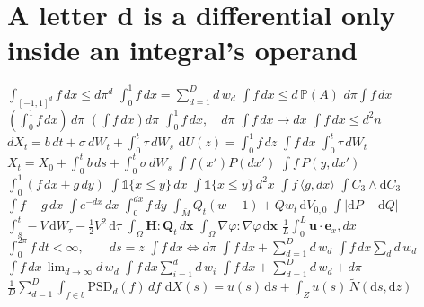 \documentclass{article}
\begin{document}
\section{A letter d is a differential only inside an integral's operand}
$\int_{[-1,1]^d}f\,dx\leq d\pi^{d}$ $\int_0^1 f\,dx=\sum_{d=1}^D d\,w_d$ $\int f\,dx\le d\,\mathbb{P}(A)$ $d\pi\int f\,dx$
$(\int_0^1 f\,dx)\,d\pi$ $\left(\int f\,dx\right) d\pi$ $\int_0^1 f\,dx,\quad d\pi$ $\int f\,dx\to d x$ $\int f\,dx\le d^2 n$
$dX_t=b\,dt+\sigma\,dW_t+\int_0^t\tau\,dW_s$ $\mathrm{d}U(z)=\int_0^1 f\,dz$
$\int f\,dx$ $\int_0^t\tau\,dW_t$ $X_t=X_0+\int_0^t b\,ds+\int_0^t\sigma\,dW_s$ $\int f(x')P(dx')$ $\int f\,P(y,dx')$
$\int_0^1(f\,dx+g\,dy)$ $\int\mathbb{1}\{x\le y\}\,dx$ $\int\mathbb{1}\{x\le y\}\,d^2x$ $\int f\,\langle g, dx\rangle$ $\int C_3\wedge\mathrm{d}C_3$
$\int f-g\,dx$ $\int e^{-d x}\,dx$ $\int_0^{d x} f\,dy$
$\int_{\bar M}Q_t(w-1)+Qw_t\,\mathrm{d}V_{0,0}$ $\int|\mathrm{d}P-\mathrm{d}Q|$ $\int_s^t-V\,\mathrm{d}W_\tau-\frac12V^2\,\mathrm{d}\tau$
$\int_\Omega\mathbf{H}:\mathbf{Q}_t\,d\mathbf{x}$ $\int_\Omega\nabla\varphi\colon\nabla\varphi\,\mathrm{d}\mathbf{x}$ $\frac1L\int_0^L\mathbf u\cdot\mathbf e_x,dx$
$\int_0^{2\pi}f\,dt<\infty,\qquad ds=z$ $\int f\,dx\iff d\pi$ $\int f\,dx+\sum_{d=1}^D d\,w_d$
$\int f\,dx\sum_{d} d\,w_d$ $\int f\,dx\,\lim_{d\to\infty}d\,w_d$ $\int f\,dx\sum_{i=1}^{d} d\,w_i$ $\int f\,dx+\sum_{d=1}^D d\,w_d+d\pi$
$\frac1D\sum_{d=1}^D\int_{f\in b}\mathrm{PSD}_d(f)\,df$ $\mathrm{d}X(s)=u(s)\,\mathrm{d}s+\int_Z u(s)\,\widetilde N(\mathrm{d}s,\mathrm{d}z)$
\end{document}
